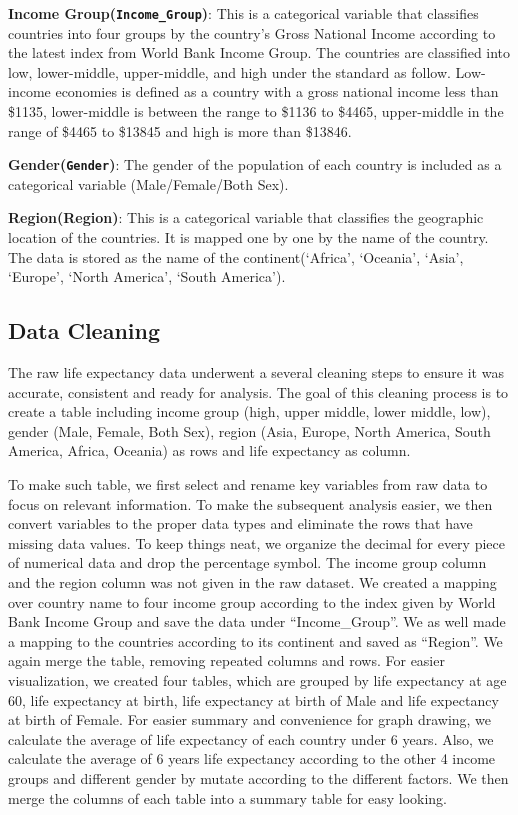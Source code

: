 \documentclass[
  letterpaper,
  DIV=11,
  numbers=noendperiod]{scrartcl}
\begin{document}
\textbf{Income Group(\texttt{Income\_Group})}: This is a categorical
variable that classifies countries into four groups by the country's
Gross National Income according to the latest index from World Bank
Income Group. The countries are classified into low, lower-middle,
upper-middle, and high under the standard as follow. Low-income
economies is defined as a country with a gross national income less than
\$1135, lower-middle is between the range to \$1136 to \$4465,
upper-middle in the range of \$4465 to \$13845 and high is more than
\$13846.

\textbf{Gender(\texttt{Gender})}: The gender of the population of each
country is included as a categorical variable (Male/Female/Both Sex).

\textbf{Region(Region)}: This is a categorical variable that classifies
the geographic location of the countries. It is mapped one by one by the
name of the country. The data is stored as the name of the
continent(`Africa', `Oceania', `Asia', `Europe', `North America', `South
America').

\subsection{Data Cleaning}\label{data-cleaning}

The raw life expectancy data underwent a several cleaning steps to
ensure it was accurate, consistent and ready for analysis. The goal of
this cleaning process is to create a table including income group (high,
upper middle, lower middle, low), gender (Male, Female, Both Sex),
region (Asia, Europe, North America, South America, Africa, Oceania) as
rows and life expectancy as column.

To make such table, we first select and rename key variables from raw
data to focus on relevant information. To make the subsequent analysis
easier, we then convert variables to the proper data types and eliminate
the rows that have missing data values. To keep things neat, we organize
the decimal for every piece of numerical data and drop the percentage
symbol. The income group column and the region column was not given in
the raw dataset. We created a mapping over country name to four income
group according to the index given by World Bank Income Group and save
the data under ``Income\_Group''. We as well made a mapping to the
countries according to its continent and saved as ``Region''. We again
merge the table, removing repeated columns and rows. For easier
visualization, we created four tables, which are grouped by life
expectancy at age 60, life expectancy at birth, life expectancy at birth
of Male and life expectancy at birth of Female. For easier summary and
convenience for graph drawing, we calculate the average of life
expectancy of each country under 6 years. Also, we calculate the average
of 6 years life expectancy according to the other 4 income groups and
different gender by mutate according to the different factors. We then
merge the columns of each table into a summary table for easy looking.
\end{document}
